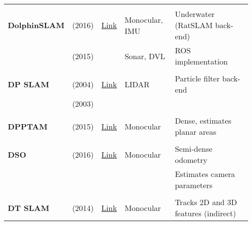 \documentclass[a4paper,12pt]{scrartcl}
\begin{document}
{\begin{longtable}{l|l|l|l|l}
                           &                                   &                                                                    &                       &\\
    \textbf{DolphinSLAM}   & \cite{Zaffari2016} (2016)         & {\href{https://github.com/dolphin-slam}{Link}}                     & Monocular, IMU        & Underwater (RatSLAM back-end)\\
                           & \cite{Silveira2015} (2015)        &                                                                    & Sonar, DVL            & ROS implementation\\
                           &                                   &                                                                    &                       &\\
    \textbf{DP SLAM}       & \cite{Eliazar2004} (2004)         & {\href{https://users.cs.duke.edu/~parr/dpslam}{Link}}              & LIDAR                 & Particle filter back-end\\
                           & \cite{Eliazar2003} (2003)         &                                                                    &                       &\\
                           &                                   &                                                                    &                       &\\
    \textbf{DPPTAM}        & \cite{Concha2015b} (2015)         & {\href{https://github.com/alejocb/dpptam}{Link}}                   & Monocular             & Dense, estimates planar areas\\
                           &                                   &                                                                    &                       &\\
    \textbf{DSO}           & \cite{Engel2016} (2016)           & {\href{https://github.com/JakobEngel/dso}{Link}}                   & Monocular             & Semi-dense odometry\\
                           &                                   &                                                                    &                       & Estimates camera parameters\\
                           &                                   &                                                                    &                       &\\
    \textbf{DT SLAM}       & \cite{Daniel2014} (2014)          & {\href{https://github.com/plumonito/dtslam}{Link}}                 & Monocular             & Tracks 2D and 3D features (indirect)\\

\end{longtable}}
\end{document}
